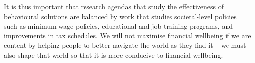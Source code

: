 It is thus important that research agendas that study the effectiveness of behavioural solutions are balanced by work that studies societal-level policies such as minimum-wage policies, educational
and job-training programs, and improvements in tax schedules. We will not
maximise financial wellbeing if we are content by helping people to better
navigate the world as they find it -- we must also shape that world so that it
is more conducive to financial wellbeing.
